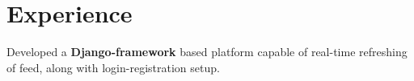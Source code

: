 \documentclass[]{css}
\begin{document}
\hfill
\begin{minipage}[t]{0.66\textwidth} 


\section{Experience}
\sectionsep



Developed a \textbf{Django-framework} based platform capable of real-time refreshing of feed, along with login-registration setup.
\sectionsep



\end{minipage}
\end{document}
